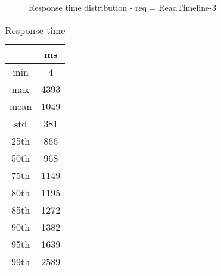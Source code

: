 \begin{minipage}{0.75\linewidth}
\begin{figure}[h]
\begin{adjustbox}{max width=1.0\linewidth, keepaspectratio}
  \end{adjustbox}
  \caption{Response time distribution - req = ReadTimeline-3}
\end{figure}
\end{minipage}\hfill\begin{minipage}{0.18\linewidth}
\begin{table}[h]
\begin{tabular}{|cc|}
\hline
\textbf{} & \textbf{ms}\\ \hline
 \Xhline{0.005\arrayrulewidth}
min & 4\\
 \Xhline{0.005\arrayrulewidth}
max & 4393\\
 \Xhline{0.005\arrayrulewidth}
mean & 1049\\
 \Xhline{0.005\arrayrulewidth}
std & 381\\
\hline
\hline
 \Xhline{0.005\arrayrulewidth}
25th & 866\\
 \Xhline{0.005\arrayrulewidth}
50th & 968\\
 \Xhline{0.005\arrayrulewidth}
75th & 1149\\
 \Xhline{0.005\arrayrulewidth}
80th & 1195\\
 \Xhline{0.005\arrayrulewidth}
85th & 1272\\
 \Xhline{0.005\arrayrulewidth}
90th & 1382\\
 \Xhline{0.005\arrayrulewidth}
95th & 1639\\
 \Xhline{0.005\arrayrulewidth}
99th & 2589\\
\hline
\end{tabular}
\caption{Response time}
\end{table}
\end{minipage}\hfill
